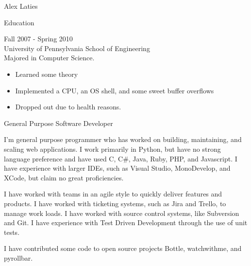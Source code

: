 \documentclass[a4paper]{article}
\begin{document}
    \begin{multicols}{2}
        \begin{LARGE}
        \noindent
        Alex Laties\\
        \end{LARGE}
        \columnbreak

        \begin{Large}
        \noindent
        Education\\
        \end{Large}
        \begingroup
        \fontsize{8pt}{12pt}\selectfont
        \noindent
        Fall 2007 - Spring 2010 \\
        University of Pennsylvania School of Engineering \\
        Majored in Computer Science.
        \begin{itemize}
            \item Learned some theory 
            \item Implemented a CPU, an OS shell, and some sweet buffer overflows 
            \item Dropped out due to health reasons.
        \end{itemize}
        \endgroup
    \end{multicols}
    

    \begin{Large}
        \noindent
        General Purpose Software Developer
    \end{Large}

    \begingroup
        \fontsize{8pt}{12pt}\selectfont
        \noindent
        I'm general purpose programmer who has worked on building, maintaining, and scaling web applications. I work primarily in Python, but have no strong language preference and have used C, C\#, Java, Ruby, PHP, and Javascript.  I have experience with larger IDEs, such as Visual Studio, MonoDevelop, and XCode, but claim no great proficiencies. \\
        \par
        \noindent
        I have worked with teams in an agile style to quickly deliver features and products. I have worked with ticketing systems, such as Jira and Trello, to manage work loads. I have worked with source control systems, like Subversion and Git. I have experience with Test Driven Development through the use of unit tests. \\
        \par
        \noindent
        I have contributed some code to open source projects Bottle, watchwithme, and pyrollbar.\\
    \endgroup
\end{document}
